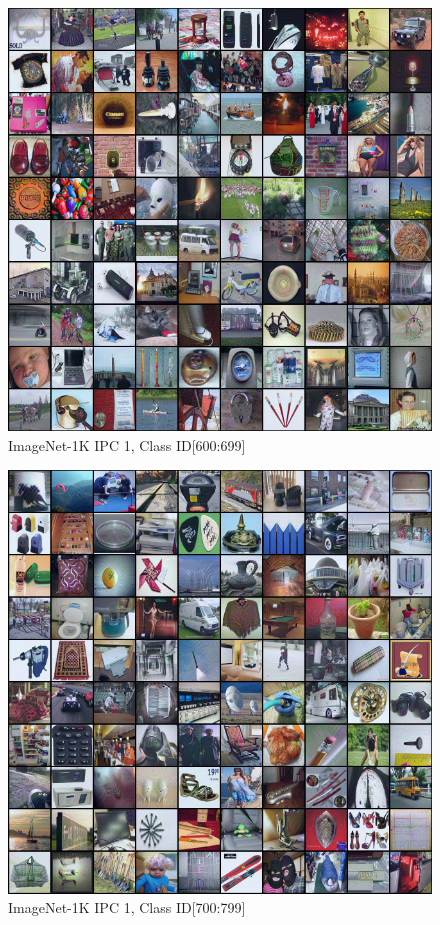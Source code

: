 \documentclass[10pt,twocolumn,letterpaper]{article}
\begin{document}
\begin{figure}
    \centering
    \includegraphics[width=\textwidth]{images/appendix/row-7-column-1.png}
    \caption{ImageNet-1K IPC 1, Class ID[600:699]}
\end{figure}
\begin{figure}
    \centering
    \includegraphics[width=\textwidth]{images/appendix/row-8-column-1.png}
    \caption{ImageNet-1K IPC 1, Class ID[700:799]}
\end{figure}
\end{document}
